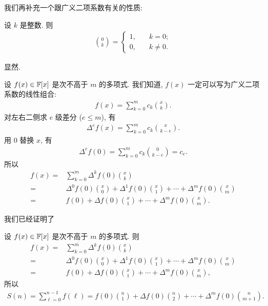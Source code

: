 我们再补充一个跟广义二项系数有关的性质:

\begin{proposition}
    设 $k$ 是整数. 则
    \begin{align*}
        \binom{0}{k} = \begin{cases}
            1, & \quad k = 0;    \\
            0, & \quad k \neq 0.
        \end{cases}
    \end{align*}
\end{proposition}

\begin{pf}
    显然.
\end{pf}

设 $f(x) \in \mathbb{F}[x]$ 是次不高于 $m$ 的多项式. 我们知道, $f(x)$ 一定可以写为广义二项系数的线性组合:
\begin{align*}
    f(x) = \sum_{k = 0}^{m} c_{k} \binom{x}{k}.
\end{align*}
对左右二侧求 $e$ 级差分 ($e \leq m$), 有
\begin{align*}
    \Delta^e f(x) = \sum_{k = 0}^{m} c_{k} \binom{x}{k - e}.
\end{align*}
用 $0$ 替换 $x$, 有
\begin{align*}
    \Delta^e f(0) = \sum_{k = 0}^{m} c_{k} \binom{0}{k - e} = c_{e}.
\end{align*}
所以
\begin{align*}
    f(x)
    = {} & \sum_{k = 0}^{m} \Delta^k f(0) \binom{x}{k}                                                   \\
    = {} & \Delta^0 f(0) \binom{x}{0} + \Delta^1 f(0) \binom{x}{1} + \cdots + \Delta^m f(0) \binom{x}{m} \\
    = {} & f(0) + \Delta f(0) \binom{x}{1} + \cdots + \Delta^m f(0) \binom{x}{m}.
\end{align*}

我们已经证明了

\begin{proposition}
    设 $f(x) \in \mathbb{F}[x]$ 是次不高于 $m$ 的多项式. 则
    \begin{align*}
        f(x)
        = {} & \sum_{k = 0}^{m} \Delta^k f(0) \binom{x}{k}                                                   \\
        = {} & \Delta^0 f(0) \binom{x}{0} + \Delta^1 f(0) \binom{x}{1} + \cdots + \Delta^m f(0) \binom{x}{m} \\
        = {} & f(0) + \Delta f(0) \binom{x}{1} + \cdots + \Delta^m f(0) \binom{x}{m},
    \end{align*}
    所以
    \begin{align*}
        S(n) = \sum_{\ell = 0}^{n - 1} f(\ell) = f(0) \binom{n}{1} + \Delta f(0) \binom{n}{2} + \cdots + \Delta^{m} f(0) \binom{n}{m + 1}.
    \end{align*}
\end{proposition}


